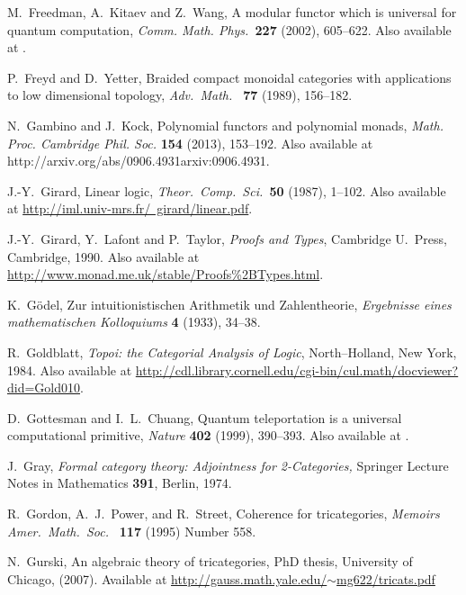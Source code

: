 \documentclass[12pt,twoside,openright]{report}
\begin{document}
\begin{thebibliography}{99}
M.\ Freedman, A.\ Kitaev and Z.\ Wang, A modular functor which is universal for quantum computation, {\sl Comm. Math. Phys.\ }{\bf 227}
(2002), 605--622.  Also available at .

P.\ Freyd and D.\ Yetter, Braided compact monoidal categories with applications to low dimensional topology,
\textsl{Adv.\ Math.\ } {\bf 77} (1989), 156--182.

 N.\ Gambino and J.\ Kock, Polynomial functors and polynomial monads,
{\sl Math. Proc. Cambridge Phil. Soc.} \textbf{154} (2013), 153--192. Also available at {http://arxiv.org/abs/0906.4931}{arxiv:0906.4931}.

 J.-Y.\ Girard, Linear logic, {\sl Theor.\ Comp.\ 
Sci.\ }{\bf 50} (1987), 1--102.  Also available at \hfill \break
\href{http://iml.univ-mrs.fr/~girard/linear.pdf}
{http://iml.univ-mrs.fr/~girard/linear.pdf}.

 J.-Y.\ Girard, Y.\ Lafont and P.\ Taylor, {\sl Proofs and Types}, Cambridge U.\ Press, Cambridge, 1990. Also available at \href{http://www.monad.me.uk/stable/Proofs\%2BTypes.html}
{http://www.monad.me.uk/stable/Proofs\%2BTypes.html}.

 K.\ G\"odel, Zur intuitionistischen Arithmetik und Zahlentheorie, {\sl Ergebnisse eines mathematischen Kolloquiums} {\bf 4} (1933), 34--38.
 
 R.\ Goldblatt, {\sl Topoi: the Categorial Analysis of Logic}, North--Holland, New York, 1984. Also available at
\href{http://cdl.library.cornell.edu/cgi-bin/cul.math/docviewer?did=Gold010}
{http://cdl.library.cornell.edu/cgi-bin/cul.math/docviewer?did=Gold010}.

 D.\ Gottesman and I.~L.~Chuang, Quantum teleportation is a universal computational primitive, 
{\sl Nature} {\bf 402} (1999), 390--393. Also available at \quantph{9908010}.

 J.\ Gray, {\sl Formal category theory: Adjointness for 2-Categories,} Springer Lecture Notes in Mathematics \textbf{391}, Berlin, 1974.

 R.\ Gordon, A.\ J.\ Power, and R.\ Street, Coherence for tricategories, \textsl{Memoirs Amer.\ Math.\  Soc.\ } \textbf{117} (1995) Number 558.

 N.\ Gurski, An algebraic theory of tricategories, PhD thesis, University of Chicago, (2007).  Available at
\href{http://gauss.math.yale.edu/~mg622/tricats.pdf}{http://gauss.math.yale.edu/$\sim$mg622/tricats.pdf}


\end{thebibliography}
\end{document}
